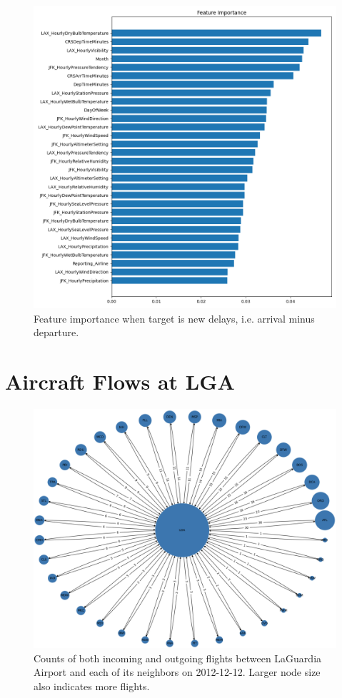 \begin{figure}[hb]
    \centering
    \includegraphics[width=0.75\linewidth]{media/features_NewDelay.png}
    \caption{Feature importance when target is new delays, i.e. arrival minus departure.}
    \label{fig:importance-new}
\end{figure}

\section{Aircraft Flows at LGA}

\begin{figure}[ht]
    \centering
    \includegraphics[width=\linewidth]{media/lga_reduced_2012_12_12_clean_cropped.png}
    \caption{Counts of both incoming and outgoing flights between LaGuardia Airport and each of its neighbors on 2012-12-12. Larger node size also indicates more flights.}
    \label{fig:lga-flows-diagram}
\end{figure}

